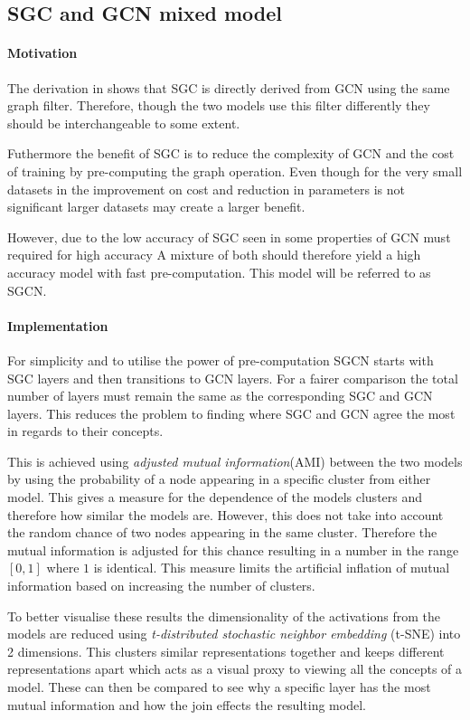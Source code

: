\subsection{SGC and GCN mixed model}
\label{sec:SGCN}
\paragraph{Motivation}
The derivation in  shows that SGC is directly derived from GCN using the same graph filter.
Therefore, though the two models use this filter differently they should be interchangeable to some extent.

Futhermore the benefit of SGC is to reduce the complexity of GCN and the cost of training by pre-computing the graph operation.
Even though for the very small datasets in  the improvement on cost and reduction in parameters is not significant larger datasets may create a larger benefit.

However, due to the low accuracy of SGC seen in  some properties of GCN must required for high accuracy 
A mixture of both should therefore yield a high accuracy model with fast pre-computation.
This model will be referred to as SGCN.

\paragraph{Implementation}
For simplicity and to utilise the power of pre-computation SGCN starts with SGC layers and then transitions to GCN layers.
For a fairer comparison the total number of layers must remain the same as the corresponding SGC and GCN layers.
This reduces the problem to finding where SGC and GCN agree the most in regards to their concepts.

This is achieved using \emph{adjusted mutual information}(AMI) between the two models by using the probability of a node appearing in a specific cluster from either model.
This gives a measure for the dependence of the models clusters and therefore how similar the models are.
However, this does not take into account the random chance of two nodes appearing in the same cluster.
Therefore the mutual information is adjusted for this chance resulting in a number in the range $[0, 1]$ where $1$ is identical.
This measure limits the artificial inflation of mutual information based on increasing the number of clusters.

To better visualise these results the dimensionality of the activations from the models are reduced using \emph{t-distributed stochastic neighbor embedding} (t-SNE) into 2 dimensions.
This clusters similar representations together and keeps different representations apart which acts as a visual proxy to viewing all the concepts of a model.
These can then be compared to see why a specific layer has the most mutual information and how the join effects the resulting model.

